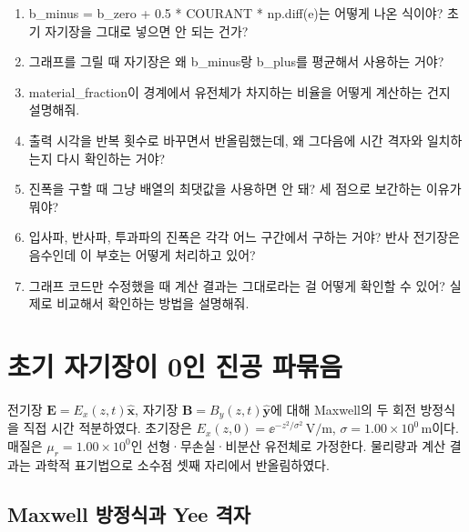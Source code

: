 \documentclass[11pt,a4paper]{article}
\newcommand{\unit}[1]{\,\mathrm{#1}}
\newcommand{\sci}[2]{\mathord{#1\times10^{#2}}}
\begin{document}
\begin{enumerate}[label=\arabic*.,leftmargin=1.8em,itemsep=0.35em,topsep=0.4em]
\item b_minus = b_zero + 0.5 * COURANT * np.diff(e)는 어떻게 나온 식이야? 초기 자기장을 그대로 넣으면 안 되는 건가?
\item 그래프를 그릴 때 자기장은 왜 b_minus랑 b_plus를 평균해서 사용하는 거야?
\item material_fraction이 경계에서 유전체가 차지하는 비율을 어떻게 계산하는 건지 설명해줘.
\item 출력 시각을 반복 횟수로 바꾸면서 반올림했는데, 왜 그다음에 시간 격자와 일치하는지 다시 확인하는 거야?
\item 진폭을 구할 때 그냥 배열의 최댓값을 사용하면 안 돼? 세 점으로 보간하는 이유가 뭐야?
\item 입사파, 반사파, 투과파의 진폭은 각각 어느 구간에서 구하는 거야? 반사 전기장은 음수인데 이 부호는 어떻게 처리하고 있어?
\item 그래프 코드만 수정했을 때 계산 결과는 그대로라는 걸 어떻게 확인할 수 있어? 실제로 비교해서 확인하는 방법을 설명해줘. 
\end{enumerate}
\newpage
\section{초기 자기장이 0인 진공 파묶음}
전기장 $\bm E=E_x(z,t)\hat{\bm x}$, 자기장 $\bm B=B_y(z,t)\hat{\bm y}$에 대해
Maxwell의 두 회전 방정식을 직접 시간 적분하였다. 초기장은
$E_x(z,0)=\ee^{-z^2/\sigma^2}\unit{V/m}$, $\sigma=\sci{1.00}{0}\unit m$이다.
매질은 $\mu_r=\sci{1.00}{0}$인 선형·무손실·비분산 유전체로 가정한다.
물리량과 계산 결과는 과학적 표기법으로 소수점 셋째 자리에서 반올림하였다.

\vspace{1em}
\subsection{Maxwell 방정식과 Yee 격자}
\end{document}
